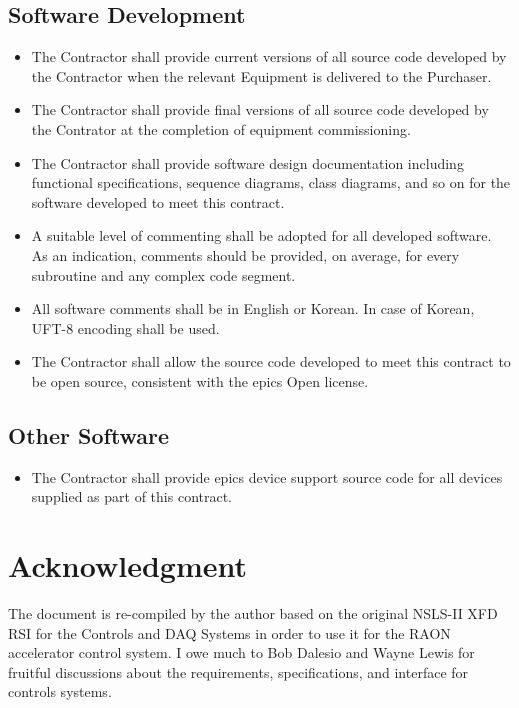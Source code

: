 \documentclass[11pt
  , a4paper
  , article
  , oneside
]{memoir}
\begin{document}
\section{Software Development}
\begin{itemize}
\item The Contractor shall provide current versions of all source code developed by the Contractor when the relevant Equipment is delivered to the Purchaser.
\item The Contractor shall provide final versions of all source code developed by the Contrator at the completion of equipment commissioning.
\item The Contractor shall provide software design documentation including functional specifications, sequence diagrams, class diagrams, and so on for the software developed to meet this contract.
\item A suitable level of commenting shall be adopted for all developed software. As an indication, comments should be provided, on average, for every subroutine and any complex code segment.
\item All software comments shall be in English or Korean. In case of Korean, UFT-8 encoding shall be used.
\item The Contractor shall allow the source code developed to meet this contract to be open source, consistent with the \Gls{epics} Open license.  
\end{itemize}

\section{Other Software}
\begin{itemize}
  \item The Contractor shall provide \Gls{epics} device support source code for all devices supplied as part of this contract.
\end{itemize}

\chapter{Acknowledgment}
The document is re-compiled by the author based on the original NSLS-II XFD RSI for the Controls and DAQ Systems \cite{LT-C-XFD-RSI-CO-001} in order to use it for the RAON accelerator control system. I owe much to Bob Dalesio and Wayne Lewis for fruitful discussions about the requirements, specifications, and interface for controls systems.


\clearpage
%
%
%

%

\end{document}
